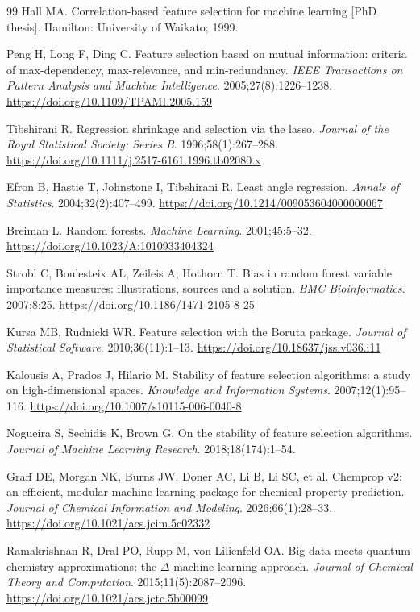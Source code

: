 \begin{thebibliography}{99}
Hall MA. Correlation-based feature selection for machine learning [PhD thesis]. Hamilton: University of Waikato; 1999.

Peng H, Long F, Ding C. Feature selection based on mutual information: criteria of max-dependency, max-relevance, and min-redundancy. \emph{IEEE Transactions on Pattern Analysis and Machine Intelligence}. 2005;27(8):1226--1238. \url{https://doi.org/10.1109/TPAMI.2005.159}

Tibshirani R. Regression shrinkage and selection via the lasso. \emph{Journal of the Royal Statistical Society: Series B}. 1996;58(1):267--288. \url{https://doi.org/10.1111/j.2517-6161.1996.tb02080.x}

Efron B, Hastie T, Johnstone I, Tibshirani R. Least angle regression. \emph{Annals of Statistics}. 2004;32(2):407--499. \url{https://doi.org/10.1214/009053604000000067}

Breiman L. Random forests. \emph{Machine Learning}. 2001;45:5--32. \url{https://doi.org/10.1023/A:1010933404324}

Strobl C, Boulesteix AL, Zeileis A, Hothorn T. Bias in random forest variable importance measures: illustrations, sources and a solution. \emph{BMC Bioinformatics}. 2007;8:25. \url{https://doi.org/10.1186/1471-2105-8-25}

Kursa MB, Rudnicki WR. Feature selection with the Boruta package. \emph{Journal of Statistical Software}. 2010;36(11):1--13. \url{https://doi.org/10.18637/jss.v036.i11}

Kalousis A, Prados J, Hilario M. Stability of feature selection algorithms: a study on high-dimensional spaces. \emph{Knowledge and Information Systems}. 2007;12(1):95--116. \url{https://doi.org/10.1007/s10115-006-0040-8}

Nogueira S, Sechidis K, Brown G. On the stability of feature selection algorithms. \emph{Journal of Machine Learning Research}. 2018;18(174):1--54.

Graff DE, Morgan NK, Burns JW, Doner AC, Li B, Li SC, et al. Chemprop v2: an efficient, modular machine learning package for chemical property prediction. \emph{Journal of Chemical Information and Modeling}. 2026;66(1):28--33. \url{https://doi.org/10.1021/acs.jcim.5c02332}

Ramakrishnan R, Dral PO, Rupp M, von Lilienfeld OA. Big data meets quantum chemistry approximations: the $\Delta$-machine learning approach. \emph{Journal of Chemical Theory and Computation}. 2015;11(5):2087--2096. \url{https://doi.org/10.1021/acs.jctc.5b00099}


\end{thebibliography}
